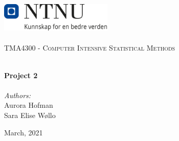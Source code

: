 
\begin{titlepage}
\vbox{ }
\vbox{ }
\begin{center}
\includegraphics[width=0.40\textwidth]{Images/NTNU_logo.png}\\[1cm]
\textsc{\LARGE }\\[1.5cm]
\textsc{\Large TMA4300 - Computer Intensive Statistical Methods}\\[0.5cm]
\vbox{ }

\HRule \\[0.4cm]
{ \huge \bfseries Project 2}\\[0.4cm]
\HRule \\[1.5cm]

\large
\emph{Authors:}\\
Aurora Hofman \\
Sara Elise Wøllo
\vfill

{\large March, 2021}
\end{center}
\end{titlepage}